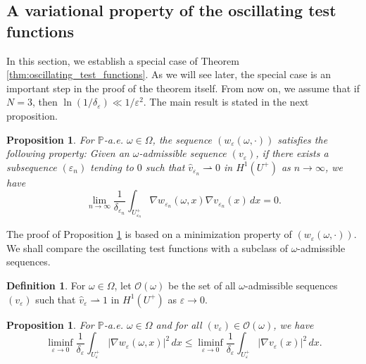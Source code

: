 \documentclass{article}
\numberwithin{equation}{section}
\newtheorem{proposition}[theorem]{Proposition}
\theoremstyle{definition}
\newtheorem{definition}[theorem]{Definition}
\theoremstyle{remark}
\begin{document}
\subsection{A variational property of the oscillating test functions} \label{ssec:variational_property}

In this section, we establish a special case of Theorem \ref{thm:oscillating_test_functions}. As we will see later, the special case is an important step in the proof of the theorem itself. From now on, we assume that if $N = 3$, then $\ln(1/\delta_\varepsilon) \ll 1/\varepsilon^2$. The main result is stated in the next proposition.

\begin{proposition} \label{pr:special_case}
    For $\mathbb{P}$-a.e. $\omega \in \Omega$, the sequence $(w_\varepsilon(\omega, \cdot))$ satisfies the following property: Given an $\omega$-admissible sequence $(v_\varepsilon)$, if there exists a subsequence $(\varepsilon_n)$ tending to $0$ such that $\hat{v}_{\varepsilon_n} \rightharpoonup 0$ in $H^1(U^+)$ as $n \to \infty$, we have
    \begin{equation} 
        \lim_{n \to \infty} \frac{1}{\delta_{\varepsilon_n}} \int_{U_{\varepsilon_n}^+} \nabla w_{\varepsilon_n}(\omega, x) \nabla v_{\varepsilon_n}(x) \, dx = 0.
    \end{equation}
\end{proposition}

The proof of Proposition \ref{pr:special_case} is based on a minimization property of $(w_\varepsilon(\omega, \cdot))$. We shall compare the oscillating test functions with a subclass of $\omega$-admissible sequences.

\begin{definition}
    For $\omega \in \Omega$, let $\mathcal{O}(\omega)$ be the set of all $\omega$-admissible sequences $(v_\varepsilon)$ such that $\hat{v}_\varepsilon \rightharpoonup 1$ in $H^1(U^+)$ as $\varepsilon \to 0$.    
\end{definition}

\begin{proposition} \label{pr:minimization_proposition}
    For $\mathbb{P}$-a.e. $\omega \in \Omega$ and for all $(v_\varepsilon) \in \mathcal{O}(\omega)$, we have
    \begin{equation} \label{eq:liminf_inequality}
        \liminf_{\varepsilon \to 0} \frac{1}{\delta_\varepsilon} \int_{U_\varepsilon^+} |\nabla w_\varepsilon(\omega, x)|^2 \, dx \le \liminf_{\varepsilon \to 0} \frac{1}{\delta_\varepsilon} \int_{U_\varepsilon^+} |\nabla v_\varepsilon(x)|^2 \, dx.
    \end{equation}
\end{proposition}
\end{document}

